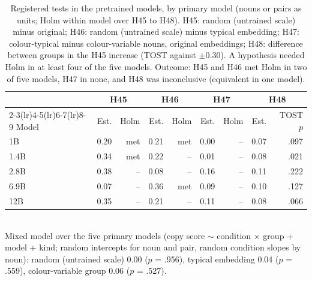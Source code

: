 \begin{table}[!htbp]
\centering\small
\caption{Registered tests in the pretrained models, by primary model (nouns or pairs as units; Holm within model over H45 to H48). H45: random (untrained scale) minus original; H46: random (untrained scale) minus typical embedding; H47: colour-typical minus colour-variable nouns, original embeddings; H48: difference between groups in the H45 increase (TOST against $\pm$0.30). A hypothesis needed Holm in at least four of the five models. Outcome: H45 and H46 met Holm in two of five models, H47 in none, and H48 was inconclusive (equivalent in one model).}
\label{tab:N6}
\begin{tabular}{@{}lrrrrrrrr@{}}
\toprule
 & \multicolumn{2}{c}{H45} & \multicolumn{2}{c}{H46} & \multicolumn{2}{c}{H47} & \multicolumn{2}{c}{H48} \\ \cmidrule(lr){2-3}\cmidrule(lr){4-5}\cmidrule(lr){6-7}\cmidrule(lr){8-9}
Model & Est. & Holm & Est. & Holm & Est. & Holm & Est. & TOST $p$ \\
\midrule
1B & 0.20 & met & 0.21 & met & 0.00 & -- & 0.07 & .097 \\
1.4B & 0.34 & met & \textminus{}0.22 & -- & \textminus{}0.01 & -- & \textminus{}0.08 & .021 \\
2.8B & \textminus{}0.38 & -- & 0.08 & -- & \textminus{}0.16 & -- & 0.11 & .222 \\
6.9B & 0.07 & -- & 0.36 & met & \textminus{}0.09 & -- & 0.10 & .127 \\
12B & \textminus{}0.35 & -- & \textminus{}0.21 & -- & 0.11 & -- & 0.08 & .066 \\
\bottomrule
\end{tabular}
\\[2pt]{\footnotesize Mixed model over the five primary models (copy score $\sim$ condition $\times$ group + model + kind; random intercepts for noun and pair, random condition slopes by noun): random (untrained scale) 0.00 ($p$ = .956), typical embedding \textminus{}0.04 ($p$ = .559), colour-variable group 0.06 ($p$ = .527).}
\end{table}

